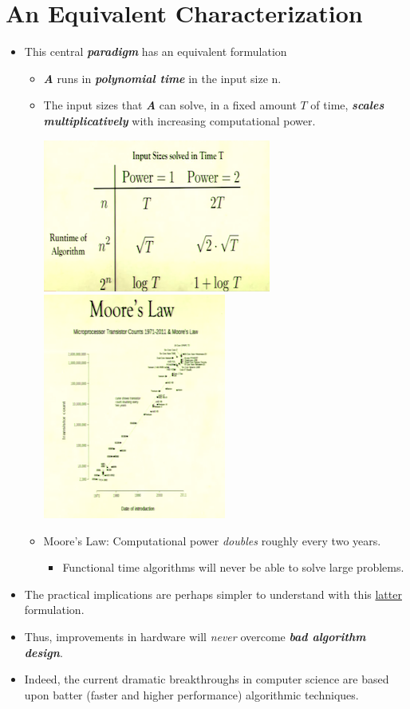\documentclass[12pt]{article}
\begin{document}
\section{An Equivalent Characterization}
\renewcommand{\labelitemii}{$\circ$}
\renewcommand{\labelitemiii}{$\cdot$}
\renewcommand{\labelitemiii}{$\rightarrow$}
\renewcommand{\labelitemiv}{$\star$}
\begin{itemize}
\item This central \textbf{\textit{paradigm}} has an equivalent formulation
	\begin{itemize}
	\item \textbf{\textit{A}} runs in \textbf{\textit{polynomial time}} in the input size n.
	\item The input sizes that \textbf{\textit{A}} can solve, in a fixed amount $T$ of time, \textbf{\textit{scales multiplicatively}} with increasing computational power.
	\begin{center}
	\includegraphics{lecture1b}
	\bigbreak
	\includegraphics{lecture1c}
	\end{center}
	\item Moore's Law: Computational power \textit{doubles} roughly every two years.
		\begin{itemize}
		\item Functional time algorithms will never be able to solve large problems.
		\end{itemize}
	\end{itemize}

\clearpage	
\item The practical implications are perhaps simpler to understand with this \underline{latter} formulation.
\item Thus, improvements in hardware will \textit{never} overcome \textbf{\textit{bad algorithm design}}.
\item Indeed, the current dramatic breakthroughs in computer science are based upon batter (faster and higher performance) algorithmic techniques.
\end{itemize}
\end{document}

